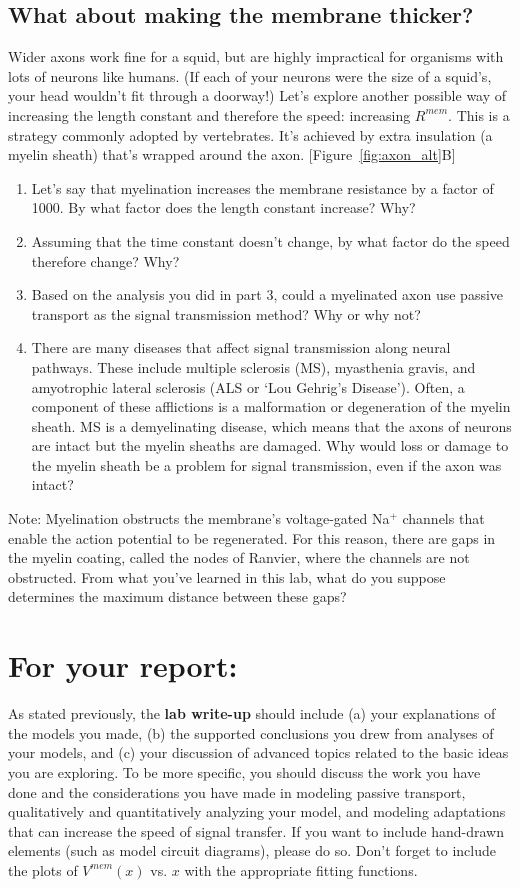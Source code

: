 \subsection*{What about making the membrane thicker?}
Wider axons work fine for a squid, but are highly impractical for organisms with lots of neurons like humans.
(If each of your neurons were the size of a squid's, your head wouldn't fit through a doorway!)
Let's explore another possible way of increasing the length constant and therefore the speed: increasing $R^{mem}$.
This is a strategy commonly adopted by vertebrates.
It's achieved by extra insulation (a myelin sheath) that's wrapped around the axon. [Figure~\ref{fig:axon_alt}B]
\begin{enumerate}
\itemsep-0.2em
\item Let's say that myelination increases the membrane resistance by a factor of 1000. By what factor does the length constant increase? Why?
\item Assuming that the time constant doesn't change, by what factor do the speed therefore change? Why?
\item Based on the analysis you did in part 3, could a myelinated axon use passive transport as the signal transmission method? Why or why not?
\item There are many diseases that affect signal transmission along neural pathways. These include multiple sclerosis (MS), myasthenia gravis, and amyotrophic lateral sclerosis (ALS or `Lou Gehrig's Disease'). Often, a component of these afflictions is a malformation or degeneration of the myelin sheath. MS is a demyelinating disease, which means that the axons of neurons are intact but the myelin sheaths are damaged. Why would loss or damage to the myelin sheath be a problem for signal transmission, even if the axon was intact?
\end{enumerate}
Note: Myelination obstructs the membrane's voltage-gated Na$^{+}$ channels that enable the action potential to be regenerated.
For this reason, there are gaps in the myelin coating, called the nodes of Ranvier, where the channels are not obstructed.
From what you've learned in this lab, what do you suppose determines the maximum distance between these gaps?

\section*{For your report:}
As stated previously, the \textbf{lab write-up} should include (a) your explanations of the models you made, (b) the supported conclusions you drew from analyses of your models, and (c) your discussion of advanced topics related to the basic ideas you are exploring.
To be more specific, you should discuss the work you have done and the considerations you have made in modeling passive transport, qualitatively and quantitatively analyzing your model, and modeling adaptations that can increase the speed of signal transfer.
If you want to include hand-drawn elements (such as model circuit diagrams), please do so.
Don't forget to include the plots of $V^{mem}(x)$ vs. $x$ with the appropriate fitting functions.

